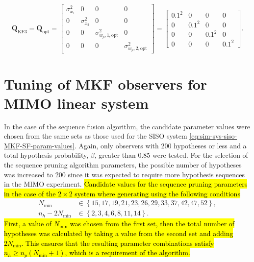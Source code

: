 \begin{equation} \label{eq:sim-sys-sim2-KF3-Q}
	\begin{aligned}
		\mathbf{Q}_{\text{KF3}}=\mathbf{Q}_{\text{opt}}=\begin{bmatrix}
			\sigma_{x_1}^2 & 0 & 0 & 0 \\
			0 & \sigma_{x_2}^2 & 0 & 0 \\
			0 & 0 & \sigma_{w_p,1,\text{opt}}^2 & 0 \\
			0 & 0 & 0 & \sigma_{w_p,2,\text{opt}}^2
		\end{bmatrix}=\begin{bmatrix}
			0.1^2 & 0 & 0 & 0 \\
			0 & 0.1^2 & 0 & 0 \\
			0 & 0 & 0.1^2 & 0 \\
			0 & 0 & 0 & 0.1^2
		\end{bmatrix}.
	\end{aligned}
\end{equation}

\section{Tuning of MKF observers for MIMO linear system} \label{sec:annex-sim-2-MKF-tuning}

 In the case of the sequence fusion algorithm, the candidate parameter values were chosen from the same sets as those used for the \gls{SISO} system \eqref{eq:sim-sys-siso-MKF-SF-param-values}. Again, only observers with 200 hypotheses or less and a total hypothesis probability, $\beta$, greater than 0.85 were tested. For the selection of the sequence pruning algorithm parameters, the possible number of hypotheses was increased to 200 since it was expected to require more hypothesis sequences in the \gls{MIMO} experiment. \hl{Candidate values for the sequence pruning parameters in the case of the $2\times2$ system where generating using the following conditions}
\begin{equation} \label{eq:sim-sys-mimo-MKF-SP-param-values}
	\begin{aligned}
		N_\text{min} &\in \left\{ 15, 17, 19, 21, 23, 26, 29, 33, 37, 42, 47, 52 \right\},  \\
		n_h - 2N_\text{min} &\in \left\{ 2, 3, 4, 6, 8, 11, 14 \right\}.  
	\end{aligned}
\end{equation}
\hl{First, a value of $N_\text{min}$ was chosen from the first set, then the total number of hypotheses was calculated by taking a value from the second set and adding $2N_\text{min}$. This ensures that the resulting parameter combinations satisfy $n_h \ge n_p(N_\text{min}+1)$, which is a requirement of the algorithm.}

